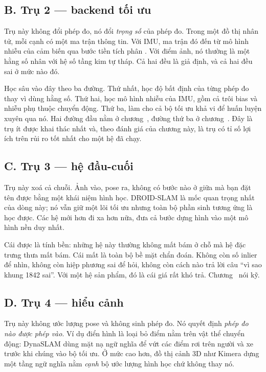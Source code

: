 \documentclass[../../deep_learning.tex]{subfiles}
\begin{document}
\subsection{B. Trụ 2 --- backend tối ưu}
Trụ này không đổi phép đo, nó đổi \emph{trọng số} của phép đo. Trong một đồ thị nhân tử, mỗi cạnh có một ma trận thông tin. Với IMU, ma trận đó đến từ mô hình nhiễu của cảm biến qua bước tiền tích phân \cite{forster2017preintegration}. Với điểm ảnh, nó thường là một hằng số nhân với hệ số tầng kim tự tháp. Cả hai đều là giả định, và cả hai đều sai ở mức nào đó.

Học sâu vào đây theo ba đường. Thứ nhất, học độ bất định của từng phép đo thay vì dùng hằng số. Thứ hai, học mô hình nhiễu của IMU, gồm cả trôi bias và nhiễu phụ thuộc chuyển động. Thứ ba, làm cho cả bộ tối ưu khả vi để huấn luyện xuyên qua nó. Hai đường đầu nằm ở chương~, đường thứ ba ở chương~. Đây là trụ ít được khai thác nhất và, theo đánh giá của chương này, là trụ có tỉ số lợi ích trên rủi ro tốt nhất cho một hệ đã chạy.

\subsection{C. Trụ 3 --- hệ đầu-cuối}
Trụ này xoá cả chuỗi. Ảnh vào, pose ra, không có bước nào ở giữa mà bạn đặt tên được bằng một khái niệm hình học. DROID-SLAM \cite{teed2021droid} là mốc quan trọng nhất của dòng này; nó vẫn giữ một lõi tối ưu nhưng toàn bộ phần sinh tương ứng là học được. Các hệ mới hơn đi xa hơn nữa, đưa cả bước dựng hình vào một mô hình nền duy nhất.

Cái được là tính bền: những hệ này thường không mất bám ở chỗ mà hệ đặc trưng thưa mất bám. Cái mất là toàn bộ bề mặt chẩn đoán. Không còn số inlier để nhìn, không còn hiệp phương sai để hỏi, không còn cách nào trả lời câu ``vì sao khung 1842 sai''. Với một hệ sản phẩm, đó là cái giá rất khó trả. Chương~ nói kỹ.

\subsection{D. Trụ 4 --- hiểu cảnh}
Trụ này không ước lượng pose và không sinh phép đo. Nó quyết định \emph{phép đo nào được phép vào}. Ví dụ điển hình là loại bỏ điểm nằm trên vật thể chuyển động: DynaSLAM \cite{bescos2018dynaslam} dùng mặt nạ ngữ nghĩa để vứt các điểm rơi trên người và xe trước khi chúng vào bộ tối ưu. Ở mức cao hơn, đồ thị cảnh 3D như Kimera \cite{rosinol2020kimera} dựng một tầng ngữ nghĩa nằm \emph{cạnh} bộ ước lượng hình học chứ không thay nó.
\end{document}
